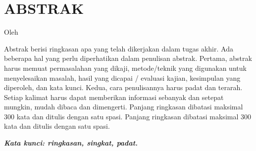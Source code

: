 \clearpage
\chapter*{ABSTRAK}

\begin{center}
  \center
  \large \bfseries \MakeUppercase{\thetitle}

  \normalfont\normalsize
  Oleh

  \theauthor
\end{center}

\vspace{1cm}

\begin{singlespace}
  Abstrak berisi ringkasan apa yang telah dikerjakan dalam tugas akhir. Ada beberapa hal yang perlu diperhatikan dalam penulisan abstrak. Pertama, abstrak harus memuat permasalahan yang dikaji, metode/teknik yang digunakan untuk menyelesaikan masalah, hasil yang dicapai / evaluasi kajian, kesimpulan yang diperoleh, dan kata kunci.  Kedua, cara penulisannya harus padat dan terarah. Setiap kalimat harus dapat memberikan informasi sebanyak dan setepat mungkin, mudah dibaca dan dimengerti. Panjang ringkasan dibatasi maksimal 300 kata dan ditulis dengan satu spasi. Panjang ringkasan dibatasi maksimal 300 kata dan ditulis dengan satu spasi.
\end{singlespace}

\textbf{\textit{Kata kunci: ringkasan, singkat, padat.}}
\clearpage